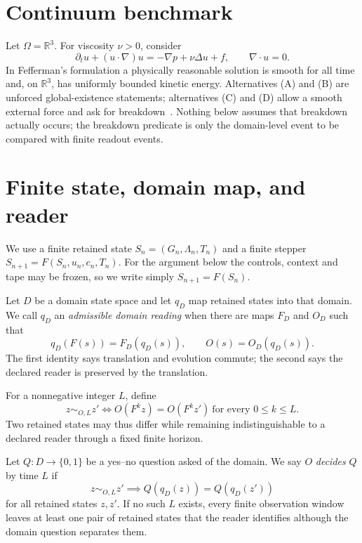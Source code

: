\documentclass[11pt]{article}
\theoremstyle{plain}
\theoremstyle{definition}
\begin{document}
\section{Continuum benchmark}

Let $\Omega = \mathbb{R}^3$. For viscosity $\nu>0$, consider
\begin{equation}
  \partial_t u + (u\cdot\nabla)u = -\nabla p + \nu\Delta u + f, \qquad \nabla\cdot u = 0. \tag{NS}
\end{equation}
In Fefferman's formulation a physically reasonable solution is smooth for all time and, on
$\mathbb{R}^3$, has uniformly bounded kinetic energy. Alternatives (A) and (B) are unforced
global-existence statements; alternatives (C) and (D) allow a smooth external force and ask for
breakdown~\cite{fefferman2006}. Nothing below assumes that breakdown actually occurs; the
breakdown predicate is only the domain-level event to be compared with finite readout events.

\section{Finite state, domain map, and reader}

We use a finite retained state $S_n = (G_n,\Lambda_n,T_n)$ and a finite stepper
$S_{n+1} = F(S_n, u_n, c_n, T_n)$. For the argument below the controls, context and tape may be
frozen, so we write simply $S_{n+1}=F(S_n)$.

Let $D$ be a domain state space and let $q_D$ map retained states into that domain. We call $q_D$
an \emph{admissible domain reading} when there are maps $F_D$ and $O_D$ such that
\begin{equation}
  q_D(F(s)) = F_D(q_D(s)), \qquad O(s) = O_D(q_D(s)). \label{eq:weld}
\end{equation}
The first identity says translation and evolution commute; the second says the declared reader is
preserved by the translation.

For a nonnegative integer $L$, define
\begin{equation}
  z \sim_{O,L} z' \iff O(F^k z) = O(F^k z') \ \text{for every } 0\le k\le L.
\end{equation}
Two retained states may thus differ while remaining indistinguishable to a declared reader through
a fixed finite horizon.

Let $Q: D\to\{0,1\}$ be a yes--no question asked of the domain. We say $O$ \emph{decides} $Q$ by
time $L$ if
\begin{equation}
  z\sim_{O,L} z' \implies Q(q_D(z)) = Q(q_D(z')) \label{eq:decide}
\end{equation}
for all retained states $z,z'$. If no such $L$ exists, every finite observation window leaves at
least one pair of retained states that the reader identifies although the domain question
separates them.
\end{document}
